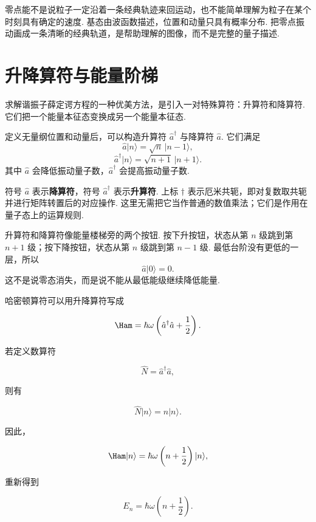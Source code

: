\documentclass[UTF8,11pt,a4paper,openany]{ctexbook}
\newcommand{\ket}[1]{\lvert #1\rangle}\newcommand{\bra}[1]{\langle #1\rvert}
\newcommand{\term}[1]{\textbf{#1}}
\begin{document}
\begin{limitbox}
零点能不是说粒子一定沿着一条经典轨迹来回运动，也不能简单理解为粒子在某个时刻具有确定的速度. 基态由波函数描述，位置和动量只具有概率分布. 把零点振动画成一条清晰的经典轨道，是帮助理解的图像，而不是完整的量子描述. 
\end{limitbox}

\section{升降算符与能量阶梯}

求解谐振子薛定谔方程的一种优美方法，是引入一对特殊算符：升算符和降算符. 它们把一个能量本征态变换成另一个能量本征态. 

\begin{definitionbox}
定义无量纲位置和动量后，可以构造升算符 $\hat a^\dagger$ 与降算符 $\hat a$. 它们满足
\[
\hat a\ket n=\sqrt n\,\ket{n-1},
\]
\[
\hat a^\dagger\ket n=\sqrt{n+1}\,\ket{n+1}.
\]
其中 $\hat a$ 会降低振动量子数，$\hat a^\dagger$ 会提高振动量子数. 
\end{definitionbox}

\begin{notationbox}
符号 $\hat a$ 表示\term{降算符}，符号 $\hat a^\dagger$ 表示\term{升算符}. 上标 $\dagger$ 表示厄米共轭，即对复数取共轭并进行矩阵转置后的对应操作. 这里无需把它当作普通的数值乘法；它们是作用在量子态上的运算规则. 
\end{notationbox}

\begin{analogybox}
升算符和降算符像能量楼梯旁的两个按钮. 按下升按钮，状态从第 $n$ 级跳到第 $n+1$ 级；按下降按钮，状态从第 $n$ 级跳到第 $n-1$ 级. 最低台阶没有更低的一层，所以
\[
\hat a\ket0=0.
\]
这不是说零态消失，而是说不能从最低能级继续降低能量. 
\end{analogybox}

哈密顿算符可以用升降算符写成

\[
\Ham=\hbar\omega\left(\hat a^\dagger\hat a+\frac12\right).
\]

若定义数算符

\[
\hat N=\hat a^\dagger\hat a,
\]

则有

\[
\hat N\ket n=n\ket n.
\]

因此，

\[
\Ham\ket n
=\hbar\omega\left(n+\frac12\right)\ket n,
\]

重新得到

\[
E_n=\hbar\omega\left(n+\frac12\right).
\]
\end{document}
